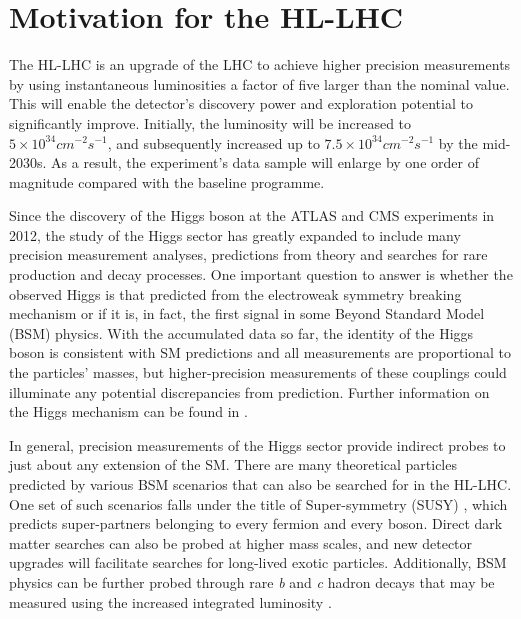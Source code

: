 \section{Motivation for the HL-LHC}
\label{hi-lumi}


The HL-LHC is an upgrade of the LHC to achieve higher precision measurements by using instantaneous luminosities a factor of five larger than the nominal value. This will enable the detector's discovery power and exploration potential to significantly improve. Initially, the luminosity will be increased to $5 \times 10^{34} cm^{−2}s^{−1}$, and subsequently increased up to $7.5 \times 10^{34} cm^{−2}s^{−1}$ by the mid-2030s. As a result, the experiment's data sample will enlarge by one order of magnitude compared with the baseline programme.

Since the discovery of the Higgs boson at the ATLAS and CMS experiments \cite{ATLAS-HIGGS, CMS-HIGGS} in 2012, the study of the Higgs sector has greatly expanded to include many precision measurement analyses, predictions from theory and searches for rare production and decay processes. One important question to answer is whether the observed Higgs is that predicted from the electroweak symmetry breaking mechanism \cite{ewsb} or if it is, in fact, the first signal in some Beyond Standard Model (BSM) physics. With the accumulated data so far, the identity of the Higgs boson is consistent with SM predictions and all measurements are proportional to the particles’ masses, but higher-precision measurements of these couplings could illuminate any potential discrepancies from prediction. Further information on the Higgs mechanism can be found in \cite{Bednyakov_2008}.


In general, precision measurements of the Higgs sector provide indirect probes to just about any extension of the SM. There are many theoretical particles predicted by various BSM scenarios that can also be searched for in the HL-LHC. One set of such scenarios falls under the title of Super-symmetry (SUSY) \cite{supersym}, which predicts super-partners belonging to every fermion and every boson. Direct dark matter searches can also be probed at higher mass scales, and new detector upgrades will facilitate searches for long-lived exotic particles. Additionally, BSM physics can be further probed through rare \textit{b} and \textit{c} hadron decays that may be measured using the increased integrated luminosity \cite{wg-bsm}.

